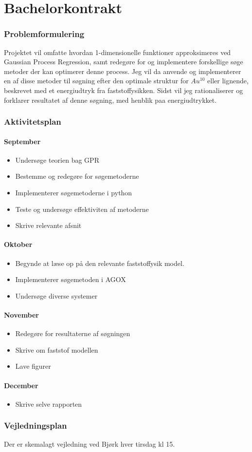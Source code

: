 \documentclass[working, oneside]{../Preambles/tuftebook}
\begin{document}
\let\cleardoublepage\clearpage
\thispagestyle{fancy}
\chapter{Bachelorkontrakt}
\subsection*{Problemformulering}
Projektet vil omfatte hvordan 1-dimensionelle funktioner approksimeres ved Gaussian Process Regression, samt redegøre for og implementere forskellige søge metoder der kan optimerer denne process. Jeg vil da anvende og implementerer en af disse metoder til søgning efter den optimale struktur for $Au^{10}$ eller lignende, beskrevet med et energiudtryk fra faststoffysikken. Sidst vil jeg rationaliserer og forklarer resultatet af denne søgning, med henblik paa energiudtrykket.
\subsection*{Aktivitetsplan}
\subsubsection*{September}
\begin{itemize}
    \item Undersøge teorien bag GPR
    \item Bestemme og redegøre for søgemetoderne
    \item Implementerer søgemetoderne i python
    \item Teste og undersøge effektiviten af metoderne
    \item Skrive relevante afsnit
\end{itemize}
\subsubsection*{Oktober}
\begin{itemize}
    \item Begynde at læse op på den relevante faststoffysik model.
    \item Implementerer søgemetoden i AGOX
    \item Undersøge diverse systemer
\end{itemize}
\subsubsection*{November}
\begin{itemize}
    \item Redegøre for resultaterne af søgningen
    \item Skrive om faststof modellen
    \item Lave figurer
\end{itemize}
\subsubsection*{December}
\begin{itemize}
    \item Skrive selve rapporten
\end{itemize}

\subsection*{Vejledningsplan}
Der er skemalagt vejledning ved Bjørk hver tirsdag kl 15.
\end{document}
